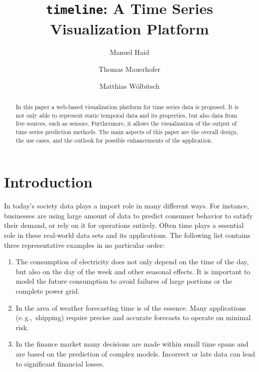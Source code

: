 \documentclass[runningheads,a4paper,11pt]{llncs}
\newcommand{\eg}{e.\,g.,\ }
\begin{document}


\title{\texttt{timeline}: A Time Series Visualization Platform}
\author{Manuel Haid \and Thomas Mauerhofer \and Matthias W\"olbitsch}

\maketitle

\begin{abstract}
In this paper a web-based visualization platform for time series data is proposed. 
It is not only able to represent static temporal data and its properties, but also data from live sources, such as sensors. 
Furthermore, it allows the visualization of the output of time series prediction methods.
The main aspects of this paper are the overall design, the use cases, and the outlook for possible enhancements of the application.
\end{abstract}



\section{Introduction}\label{sec:intro}

In today's society data plays a import role in many different ways.
For instance, businesses are using large amount of data to predict consumer behavior to satisfy their demand, or rely on it for operations entirely.
Often time plays a essential role in these real-world data sets and its applications. 
The following list contains three representative examples in no particular order:

\begin{enumerate}
 \item The consumption of electricity does not only depend on the time of the day, but also on the day of the week and other seasonal effects.
 It is important to model the future consumption to avoid failures of large portions or the complete power grid.
 
 \item In the area of weather forecasting time is of the essence. 
 Many applications (\eg shipping) require precise and accurate forecasts to operate on minimal risk.
 
 \item In the finance market many decisions are made within small time spans and are based on the prediction of complex models.
 Incorrect or late data can lead to significant financial losses.
\end{enumerate}
\end{document}
